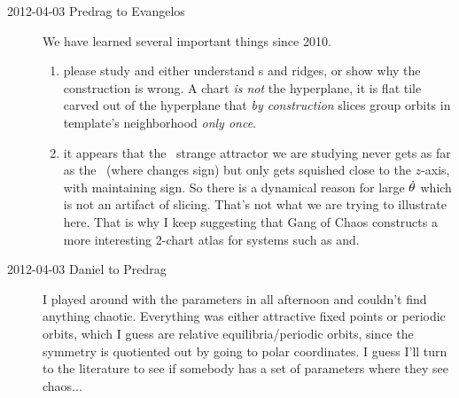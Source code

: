 \begin{description}
\item[2012-04-03 Predrag to Evangelos] We have learned several important things since
2010.
\begin{enumerate}
  \item
    please study and either understand \chartBord s and ridges, or show
    why the construction is wrong. A chart \emph{is not} the hyperplane,
    it is flat tile carved out of the hyperplane that \emph{by construction}
    slices group orbits in template's neighborhood \emph{only once}.
  \item
    it appears that the \cLe\ strange attractor we are studying never
    gets as far as the \chartBord\ (where  changes
    sign) but only gets squished close to the $z$-axis, with
     maintaining sign. So there is a dynamical reason
    for large $\dot{\theta}$ which is not an artifact of slicing. That's
    not what we are trying to illustrate here. That is why I keep
    suggesting that Gang of Chaos constructs a more interesting 2-chart
    atlas for {\twoMode} systems such as  and.
\end{enumerate}

\item[2012-04-03 Daniel to Predrag] I played around with the parameters
in  all afternoon and couldn't find anything chaotic.
Everything was either attractive fixed points or periodic orbits, which I
guess are relative equilibria/periodic orbits, since the symmetry is
quotiented out by going to polar coordinates. I guess I'll turn to the
literature to see if somebody has a set of parameters where they see
chaos...


\end{description}
